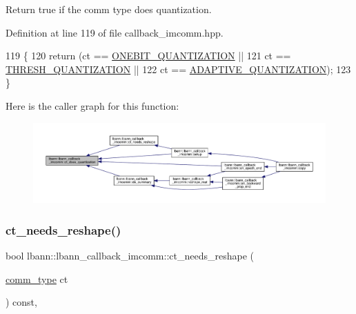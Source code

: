 Return true if the comm type does quantization. 

Definition at line 119 of file callback\+\_\+imcomm.\+hpp.


\begin{DoxyCode}
119                                                        \{
120     \textcolor{keywordflow}{return} (ct == \hyperlink{classlbann_1_1lbann__callback__imcomm_acf7e894b3381e7f9b71020dc73594d6aa06f19090efbd982638c20bcb8a3c7d33}{ONEBIT\_QUANTIZATION} ||
121             ct == \hyperlink{classlbann_1_1lbann__callback__imcomm_acf7e894b3381e7f9b71020dc73594d6aa76420a96a3df1d5b60140bab6bc32dc4}{THRESH\_QUANTIZATION} ||
122             ct == \hyperlink{classlbann_1_1lbann__callback__imcomm_acf7e894b3381e7f9b71020dc73594d6aaeb95973ab89fc579b91554cd783031b7}{ADAPTIVE\_QUANTIZATION});
123   \}
\end{DoxyCode}
Here is the caller graph for this function\+:\nopagebreak
\begin{figure}[H]
\begin{center}
\leavevmode
\includegraphics[width=350pt]{classlbann_1_1lbann__callback__imcomm_a8b29853e49c58cf737a741c503737705_icgraph}
\end{center}
\end{figure}
\mbox{\label{classlbann_1_1lbann__callback__imcomm_ab7106f5ee53672f5ef5a58371eb39f0b}} 
\subsubsection{\texorpdfstring{ct\+\_\+needs\+\_\+reshape()}{ct\_needs\_reshape()}}
{\footnotesize\ttfamily bool lbann\+::lbann\+\_\+callback\+\_\+imcomm\+::ct\+\_\+needs\+\_\+reshape (\begin{DoxyParamCaption}\item[{\hyperlink{classlbann_1_1lbann__callback__imcomm_acf7e894b3381e7f9b71020dc73594d6a}{comm\+\_\+type}}]{ct }\end{DoxyParamCaption}) const\hspace{0.3cm}{\ttfamily [inline]}, {\ttfamily [private]}}

